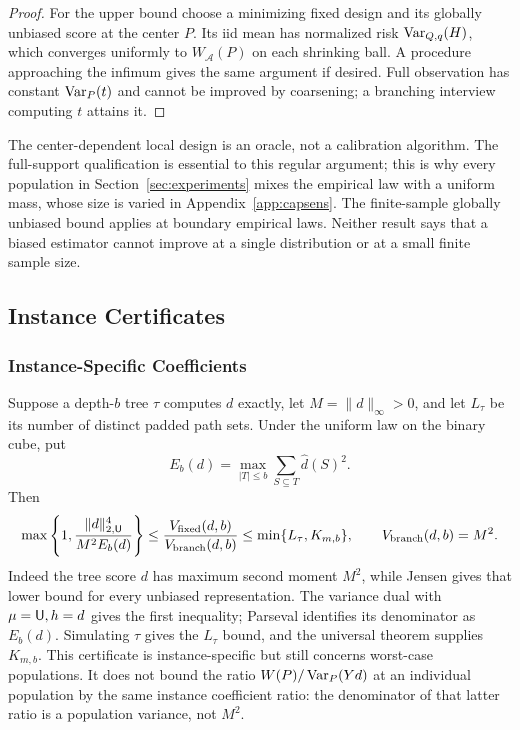 \begin{proof}
For the upper bound choose a minimizing fixed design and its globally
unbiased score at the center $P$. Its iid mean has normalized risk
$\operatorname{Var}_{Q,q}(H)$, which converges uniformly to $W_{\mathcal A}(P)$ on each
shrinking ball. A procedure approaching the infimum gives the same argument
if desired. Full observation has constant $\operatorname{Var}_P(t)$ and cannot be improved
by coarsening; a branching interview computing $t$ attains it.
\end{proof}

The center-dependent local design is an oracle, not a calibration algorithm.
The full-support qualification is essential to this regular argument; this is
why every population in Section~\ref{sec:experiments} mixes the empirical law
with a uniform mass, whose size is varied in Appendix~\ref{app:capsens}.
The finite-sample globally unbiased bound applies at
boundary empirical laws. Neither result says that a biased estimator cannot
improve at a single distribution or at a small finite sample size.

\subsection{Instance Certificates}\label{app:instances}
\subsubsection{Instance-Specific Coefficients}
Suppose a depth-$b$ tree $\tau$ computes $d$ exactly, let $M=\|d\|_\infty>0$, and let $L_\tau$ be its number of distinct padded path sets. Under the uniform law on the binary cube, put
\[
 E_b(d)=\max_{|T|\le b}\sum_{S\subseteq T}\widehat d(S)^2.
\]
Then
\begin{equation}
 \max\left\{1,\frac{\|d\|_{2,\mathsf U}^4}{M^2 E_b(d)}\right\}
 \le \frac{V_{\rm fixed}(d,b)}{V_{\rm branch}(d,b)}
 \le \min\{L_\tau,K_{m,b}\},\qquad V_{\rm branch}(d,b)=M^2.
 \label{eq:instanceinterval}
\end{equation}
Indeed the tree score $d$ has maximum second moment $M^2$, while Jensen gives that lower bound for every unbiased representation. The variance dual with $\mu=\mathsf U,h=d$ gives the first inequality; Parseval identifies its denominator as $E_b(d)$. Simulating $\tau$ gives the $L_\tau$ bound, and the universal theorem supplies $K_{m,b}$. This certificate is instance-specific but still concerns worst-case populations. It does not bound the ratio $W(P)/\operatorname{Var}_P(Yd)$ at an individual population by the same instance coefficient ratio: the denominator of that latter ratio is a population variance, not $M^2$.

